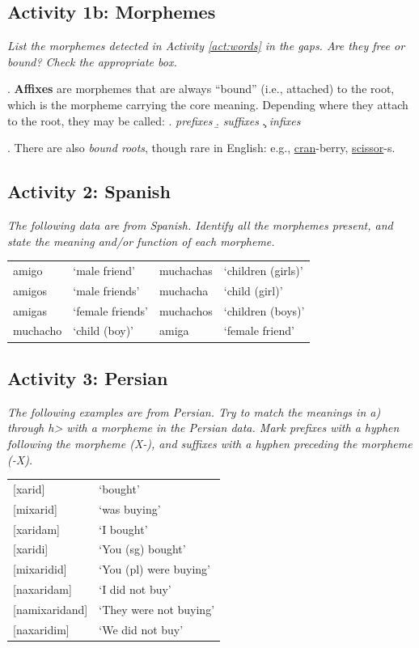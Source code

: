 \documentclass[11pt, oneside]{article}   	%
\begin{document}
\subsection{Activity 1b: Morphemes}

{\itshape List the morphemes detected in Activity \ref{act:words} in the gaps. Are they free or bound? Check the appropriate box.}


\ex. {\bfseries Affixes} are morphemes that are always ``bound'' (i.e., attached) to the root, which is the morpheme carrying the core meaning. Depending where they attach to the root, they may be called:
	\a. {\itshape prefixes}
	\b. {\itshape suffixes}
	\c. {\itshape infixes}

\ex. There are also {\itshape bound roots}, though rare in English: e.g., \underline{cran}-berry, \underline{scissor}-s.

\subsection{Activity 2: Spanish}

{\itshape The following data are from Spanish. Identify all the morphemes present, and state the meaning and/or function of each morpheme.}

\begin{center}
\begin{tabular}{l l | l l}
amigo & `male friend'	&	muchachas	& `children (girls)' \\
amigos & `male friends'	&	muchacha	&	`child (girl)'	\\
amigas & `female friends' & muchachos	& `children (boys)' \\
muchacho & `child (boy)' & amiga	&	`female friend' \\
\end{tabular}
\end{center}

\subsection{Activity 3: Persian}

{\itshape The following examples are from Persian. Try to match the meanings in a) through h> with a morpheme in the Persian data. Mark prefixes with a hyphen following the morpheme (X-), and suffixes with a hyphen preceding the morpheme (-X).}

\begin{center}
\begin{tabular}{l l}
{[}xarid]		&	`bought' \\
{[}mixarid]	& 	`was buying' \\	
{[}xaridam]	& 	`I bought' \\
{[}xaridi]	&	`You (sg) bought' \\
{[}mixaridid]	&	`You (pl) were buying' \\
{[}naxaridam]	&	`I did not buy' \\
{[}namixaridand] &	`They were not buying' \\
{[}naxaridim]		&	`We did not buy' \\
\end{tabular}
\end{center}
\end{document}
